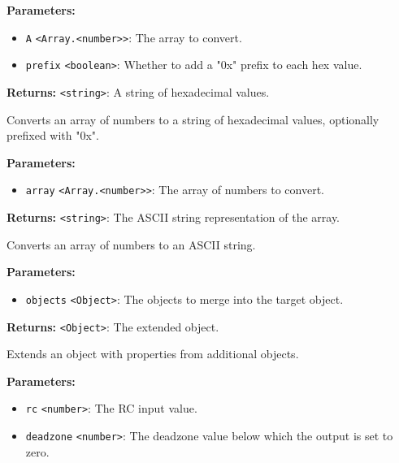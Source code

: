 \documentclass[12pt,a4paper]{article}
\begin{document}
\noindent \textbf{Parameters:}
\begin{itemize}
  \item \texttt{A} \texttt{<Array.<number>>}: The array to convert.
  \item \texttt{prefix} \texttt{<boolean>}: Whether to add a "0x" prefix to each hex value.
\end{itemize}

\noindent \textbf{Returns:} \texttt{<string>}: A string of hexadecimal values.

\noindent Converts an array of numbers to a string of hexadecimal values, optionally prefixed with "0x".

\vspace{5mm}
\noindent {}


\noindent \textbf{Parameters:}
\begin{itemize}
  \item \texttt{array} \texttt{<Array.<number>>}: The array of numbers to convert.
\end{itemize}

\noindent \textbf{Returns:} \texttt{<string>}: The ASCII string representation of the array.

\noindent Converts an array of numbers to an ASCII string.

\vspace{5mm}
\noindent {}


\noindent \textbf{Parameters:}
\begin{itemize}
  \item \texttt{objects} \texttt{<Object>}: The objects to merge into the target object.
\end{itemize}

\noindent \textbf{Returns:} \texttt{<Object>}: The extended object.

\noindent Extends an object with properties from additional objects.

\vspace{5mm}
\noindent {}


\noindent \textbf{Parameters:}
\begin{itemize}
  \item \texttt{rc} \texttt{<number>}: The RC input value.
  \item \texttt{deadzone} \texttt{<number>}: The deadzone value below which the output is set to zero.
\end{itemize}
\end{document}
